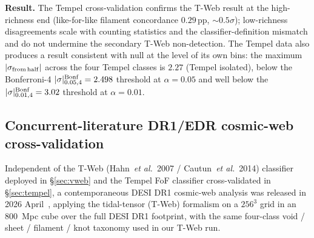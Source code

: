\documentclass[aps,prd,twocolumn,superscriptaddress,showpacs,preprintnumbers,nofootinbib,longbibliography,floatfix]{revtex4-2}
\begin{document}
\textbf{Result.} The Tempel cross-validation confirms the T-Web
result at the high-richness end (like-for-like filament concordance
$0.29$\,pp, ${\sim}0.5\sigma$);
low-richness disagreements scale with counting statistics and the
classifier-definition mismatch and do not undermine the
secondary T-Web non-detection. The Tempel data also produces a
result consistent with null at the level of its own bins: the maximum
$|\sigma_{\rm from\,half}|$ across the four Tempel classes is
$2.27$ (Tempel isolated), below the Bonferroni-4
$|\sigma|^{\rm Bonf}_{0.05,4}=2.498$ threshold at $\alpha = 0.05$ and
well below the
$|\sigma|^{\rm Bonf}_{0.01,4}=3.02$ threshold at $\alpha = 0.01$.

\subsection{Concurrent-literature DR1/EDR cosmic-web
cross-validation}\label{sec:tweb_concurrent}

Independent of the T-Web (Hahn~\textit{et al.}~2007 / Cautun~\textit{et
al.}~2014) classifier deployed in \S\ref{sec:vweb} and the Tempel FoF
classifier cross-validated in \S\ref{sec:tempel}, a contemporaneous
DESI DR1 cosmic-web analysis was released in 2026
April~\cite{TWebDESI2026}, applying the tidal-tensor (T-Web) formalism
on a $256^{3}$ grid in an $800$~Mpc cube over the full DESI DR1
footprint, with the same four-class void / sheet / filament / knot
taxonomy used in our T-Web run.
\end{document}
